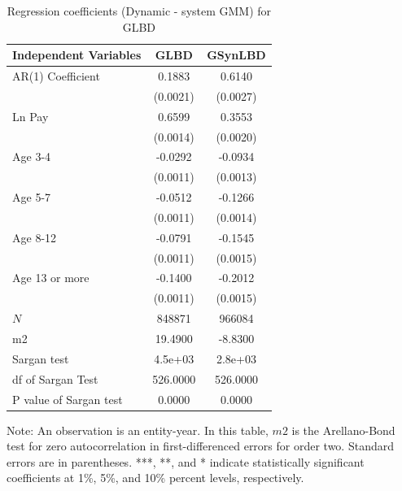 \documentclass[10pt,twoside]{article}
\newcommand{\sym}[1]{\rlap{#1}}
\begin{document}
\begin{table}[H]
  \centering
\caption{Regression coefficients (Dynamic - system GMM) for GLBD} \label{tab:Dynamic - system GMM_ger} \medskip
\renewcommand{\arraystretch}{1}
\setlength{\tabcolsep}{14pt}
\begin{tabular}{l|c| c}
\toprule
\textbf{Independent Variables}&\textbf{GLBD} &\textbf{GSynLBD}\\
\midrule
AR(1) Coefficient&   0.1883\sym{***}&   0.6140\sym{***}\\
          & (0.0021)         & (0.0027)         \\
[1em]
Ln Pay    &   0.6599\sym{***}&   0.3553\sym{***}\\
          & (0.0014)         & (0.0020)         \\
[1em]
Age 3-4   &  -0.0292\sym{***}&  -0.0934\sym{***}\\
          & (0.0011)         & (0.0013)         \\
[1em]
Age 5-7   &  -0.0512\sym{***}&  -0.1266\sym{***}\\
          & (0.0011)         & (0.0014)         \\
[1em]
Age 8-12  &  -0.0791\sym{***}&  -0.1545\sym{***}\\
          & (0.0011)         & (0.0015)         \\
[1em]
Age 13 or more&  -0.1400\sym{***}&  -0.2012\sym{***}\\
          & (0.0011)         & (0.0015)         \\
\hline
\(N\)     &   848871         &   966084         \\
m2        &  19.4900         &  -8.8300         \\
Sargan test&  4.5e+03         &  2.8e+03         \\
df of Sargan Test& 526.0000         & 526.0000         \\
P value of Sargan test&   0.0000         &   0.0000         \\
    \bottomrule
  \end{tabular} 
\begin{tablenotes}
\small
\item Note: An observation is an entity-year. In this table, $m2$ is the Arellano-Bond test for zero autocorrelation in first-differenced errors for order two. Standard errors are in parentheses. ***, **, and * indicate statistically significant coefficients at 1\%, 5\%, and 10\% percent levels, respectively.
 \end{tablenotes}
\end{table}
\end{document}
